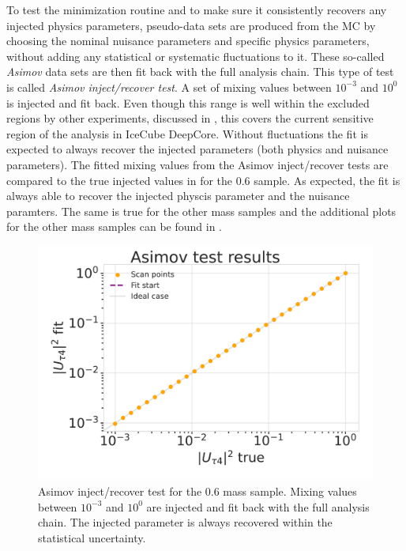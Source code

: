 To test the minimization routine and to make sure it consistently recovers any injected physics parameters, pseudo-data sets are produced from the MC by choosing the nominal nuisance parameters and specific physics parameters, without adding any statistical or systematic fluctuations to it. These so-called \textit{Asimov} data sets are then fit back with the full analysis chain. This type of test is called \textit{Asimov inject/recover test}. A set of mixing values between $10^{-3}$ and $10^{0}$ is injected and fit back. Even though this range is well within the excluded regions by other experiments, discussed in , this covers the current sensitive region of the analysis in IceCube DeepCore. Without fluctuations the fit is expected to always recover the injected parameters (both physics and nuisance parameters). The fitted mixing values from the Asimov inject/recover tests are compared to the true injected values in  for the \SI{0.6}{\gev} sample. As expected, the fit is always able to recover the injected physcis parameter and the nuisance paramters. The same is true for the other mass samples and the additional plots for the other mass samples can be found in .

\begin{figure}[h]
    \includegraphics{figures/results/checks/asimov_scan_0.6_GeV-01.png}
	\caption[Asimov inject/recover test (\SI{0.6}{\gev})]{Asimov inject/recover test for the \SI{0.6}{\gev} mass sample. Mixing values between $10^{-3}$ and $10^{0}$ are injected and fit back with the full analysis chain. The injected parameter is always recovered within the statistical uncertainty.}
\end{figure}


